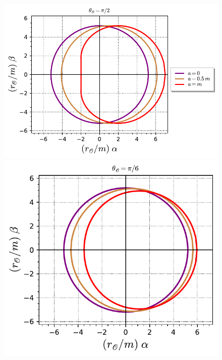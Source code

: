 \begin{figure}
\begin{center}
\includegraphics[height=0.28\textheight]{gik_shadow_comp_th90.pdf} \\[1ex]
\includegraphics[height=0.28\textheight]{gik_shadow_comp_th30.pdf}\qquad

\end{center}
\end{figure}
